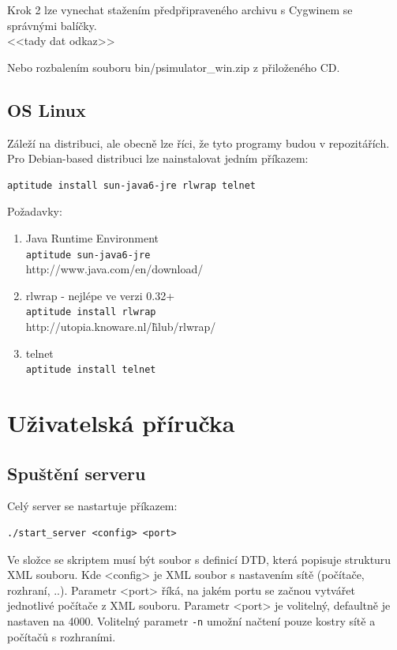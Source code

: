 \documentclass[11pt,twoside,a4paper]{book}
\begin{document}
\noindent
Krok 2 lze vynechat stažením předpřipraveného archivu s Cygwinem se správnými balíčky.\\
<<tady dat odkaz>>

\noindent
Nebo rozbalením souboru bin/psimulator\_win.zip z přiloženého CD.


\subsection{OS Linux}
Záleží na distribuci, ale obecně lze říci, že tyto programy budou v repozitářích.
Pro Debian-based distribuci lze nainstalovat jedním příkazem:
\begin{verbatim}
aptitude install sun-java6-jre rlwrap telnet
\end{verbatim} 

Požadavky:
\begin{enumerate}
\item Java Runtime Environment\\
      \verb|aptitude sun-java6-jre|\\
      http://www.java.com/en/download/
\item rlwrap - nejlépe ve verzi 0.32+\\
    \verb|aptitude install rlwrap|\\
    http://utopia.knoware.nl/\~hlub/rlwrap/
\item telnet\\
    \verb|aptitude install telnet|
\end{enumerate}





\section{Uživatelská příručka} 

\subsection{Spuštění serveru} 

Celý server se nastartuje příkazem:
\begin{verbatim}
./start_server <config> <port> 
\end{verbatim} 

Ve složce se skriptem musí být soubor s definicí DTD, která popisuje strukturu XML souboru.
Kde <config> je XML soubor s nastavením sítě (počítače, rozhraní, ..).
Parametr <port> říká, na jakém portu se začnou vytvářet jednotlivé počítače z XML souboru.
Parametr <port> je volitelný, defaultně je nastaven na 4000.
Volitelný parametr \verb|-n| umožní načtení pouze kostry sítě a počítačů s rozhraními.
\end{document}

